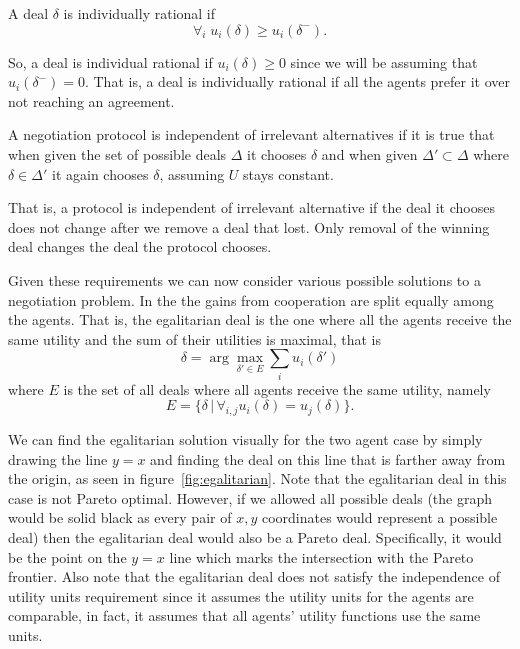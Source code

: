 \begin{definition}
  \label{def:individual-rationality}
  A deal $\delta$ is individually rational if \[\forall_i \;
  u_i(\delta) \geq u_i(\delta^-).\]
\end{definition}
So, a deal is individual rational if $u_i(\delta) \geq 0$ since we
will be assuming that $u_i(\delta^-) = 0$. That is, a deal is
individually rational if all the agents prefer it over not reaching an
agreement.

\begin{definition}
  \label{def:iia}
  A negotiation protocol is independent of irrelevant alternatives if
  it is true that when given the set of possible deals $\Delta$ it
  chooses $\delta$ and when given $\Delta' \subset \Delta$ where
  $\delta \in \Delta'$ it again chooses $\delta$, assuming $U$ stays
  constant.
\end{definition}
That is, a protocol is independent of irrelevant alternative if the
deal it chooses does not change after we remove a deal that lost. Only
removal of the winning deal changes the deal the protocol chooses.

Given these requirements we can now consider various possible
solutions to a negotiation problem. In the 
the gains from cooperation are split equally among the agents. That
is, the egalitarian deal is the one where all the agents receive the
same utility and the sum of their utilities is maximal, that is
\begin{equation}
  \label{eq:n-egalitarian}
  \delta = \arg \max_{\delta' \in E} \sum_i u_i(\delta')
\end{equation}
where $E$ is the set of all deals where all agents receive the same
utility, namely
\[
E = \{ \delta \,|\, \forall_{i,j} u_i(\delta) = u_j(\delta)\}. \] 

 We can find the egalitarian solution visually for the two
agent case by simply drawing the line $y=x$ and finding the deal on
this line that is farther away from the origin, as seen in
figure~\ref{fig:egalitarian}. Note that the egalitarian deal in this
case is not Pareto optimal. However, if we allowed all possible deals
(the graph would be solid black as every pair of $x,y$ coordinates
would represent a possible deal) then the egalitarian deal would also
be a Pareto deal. Specifically, it would be the point on the $y=x$
line which marks the intersection with the Pareto frontier. Also note
that the egalitarian deal does not satisfy the independence of utility
units requirement since it assumes the utility units for the agents
are comparable, in fact, it assumes that all agents' utility functions
use the same units.


